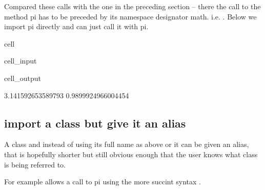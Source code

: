 \documentclass[letterpaper,10pt,english]{jupyterBook}
\begin{document}
\sphinxAtStartPar
Compared these calls with the one in the preceding section – there the call to the method pi has to be preceded by its namespace designator math.  i.e. . Below we import pi directly and can just call it with pi.

\begin{sphinxuseclass}{cell}\begin{sphinxVerbatimInput}

\begin{sphinxuseclass}{cell_input}
\begin{sphinxVerbatim}[commandchars=\\\{\}]
   

\end{sphinxVerbatim}

\end{sphinxuseclass}\end{sphinxVerbatimInput}
\begin{sphinxVerbatimOutput}

\begin{sphinxuseclass}{cell_output}
\begin{sphinxVerbatim}[commandchars=\\\{\}]
3.141592653589793
\PYGZhy{}0.9899924966004454
\end{sphinxVerbatim}

\end{sphinxuseclass}\end{sphinxVerbatimOutput}

\end{sphinxuseclass}

\subsection{import a class but give it an alias}
\label{\detokenize{content/04_PythonEssentials/PythonPackagesEtc:import-a-class-but-give-it-an-alias}}
\sphinxAtStartPar
A class and instead of using its full name as above or it can be given an alias, that is hopefully shorter but still obvious enough that the user knows what class is being referred to.

\sphinxAtStartPar
For example   allows a call to pi using the more succint syntax .
\end{document}
